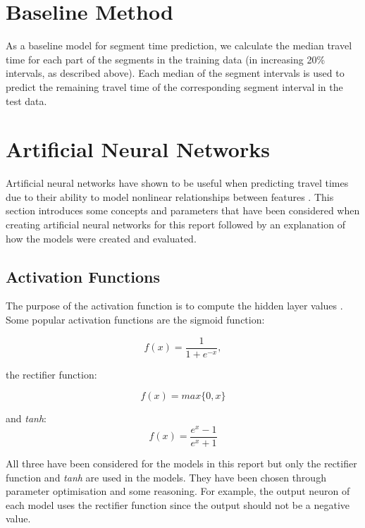 \section{Baseline Method}
As a baseline model for segment time prediction, we calculate the median travel time for each part of the segments in the training data (in increasing 20\% intervals, as described above). Each median of the segment intervals is used to predict the remaining travel time of the corresponding segment interval in the test data.

\section{Artificial Neural Networks}

Artificial neural networks have shown to be useful when predicting travel times due to their ability to model nonlinear relationships between features \cite{brazilANN}\cite{malaysiaANN}. This section introduces some concepts and parameters that have been considered when creating artificial neural networks for this report followed by an explanation of how the models were created and evaluated.

\subsection{Activation Functions}
The purpose of the activation function is to compute the hidden layer values \cite{Goodfellow-et-al-2016}. Some popular activation functions are the sigmoid function:

\begin{equation} 
    f(x) = \frac{1}{1+e^{-x}},
\end{equation}

the rectifier function:

\begin{equation} 
    f(x) = max\{0,x\}
\end{equation}

and \textit{tanh}:
\begin{equation} 
    f(x) =  \frac{e^x-1}{e^{x}+1} 
\end{equation}

All three have been considered for the models in this report but only the rectifier function and \textit{tanh} are used in the models. They have been chosen through parameter optimisation and some reasoning. For example, the output neuron of each model uses the rectifier function since the output should not be a negative value.

